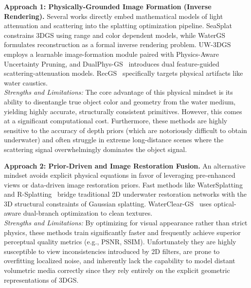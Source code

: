 \textbf{Approach 1: Physically-Grounded Image Formation (Inverse Rendering).} 
Several works directly embed mathematical models of light attenuation and scattering into the splatting optimization pipeline. SeaSplat~\cite{11128502} constrains 3DGS using range and color dependent models, while WaterGS~\cite{article} formulates reconstruction as a formal inverse rendering problem. UW-3DGS~\cite{xing2025uw3dgsunderwater3dreconstruction} employs a learnable image-formation module paired with Physics-Aware Uncertainty Pruning, and DualPhys-GS~\cite{LI2025104405} introduces dual feature-guided scattering-attenuation models. RecGS~\cite{zhang2024recgsremovingwatercaustic} specifically targets physical artifacts like water caustics. 
\\ \textit{Strengths and Limitations:} The core advantage of this physical mindset is its ability to disentangle true object color and geometry from the water medium, yielding highly accurate, structurally consistent primitives. However, this comes at a significant computational cost. Furthermore, these methods are highly sensitive to the accuracy of depth priors (which are notoriously difficult to obtain underwater) and often struggle in extreme long-distance scenes where the scattering signal overwhelmingly dominates the object signal.

\textbf{Approach 2: Prior-Driven and Image Restoration Fusion.}
An alternative mindset avoids explicit physical equations in favor of leveraging pre-enhanced views or data-driven image restoration priors. Fast methods like WaterSplatting~\cite{li2025watersplattingfastunderwater3d} and R-Splatting~\cite{huang2025restorationreconstructionrethinking3d} bridge traditional 2D underwater restoration networks with the 3D structural constraints of Gaussian splatting. WaterClear-GS~\cite{zhang2026watercleargsopticalawaregaussiansplatting} uses optical-aware dual-branch optimization to clean textures. 
\\ \textit{Strengths and Limitations:} By optimizing for visual appearance rather than strict physics, these methods train significantly faster and frequently achieve superior perceptual quality metrics (e.g., PSNR, SSIM). Unfortunately they are highly susceptible to view inconsistencies introduced by 2D filters, are prone to overfitting localized noise, and inherently lack the capability to model distant volumetric media correctly since they rely entirely on the explicit geometric representations of 3DGS.

